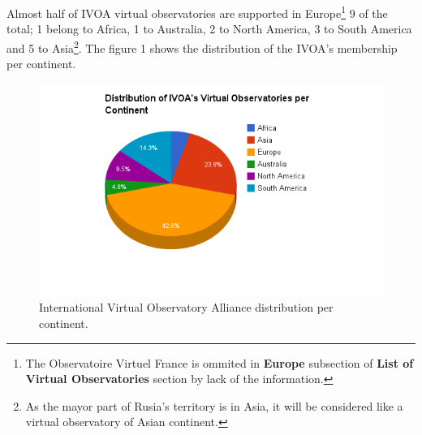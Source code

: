 Almost half of IVOA virtual observatories are supported in Europe\footnote{The
Observatoire Virtuel France is ommited in \textbf{Europe} subsection of
\textbf{List of Virtual Observatories} section by lack of the information.} 9 of
the total; 1 belong to Africa, 1 to Australia, 2 to North America, 3 to South
America and 5 to Asia\footnote{As the mayor part of Rusia's territory is in
Asia, it will be considered like a virtual observatory of Asian continent.}. The
figure 1 shows the distribution of the IVOA's membership per continent.\\

\begin{figure}%
\begin{center}
	\includegraphics[scale=0.6]{img/vo_distribution.png}
	\caption{International Virtual Observatory Alliance distribution per
             continent.}
\end{center}
\end{figure}


